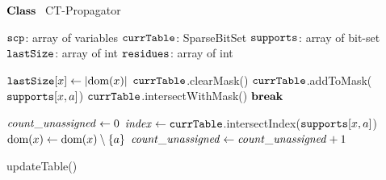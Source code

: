 \STATE $\textbf{Class~}$ CT-Propagator
    \item[]
      \STATE $\texttt{scp}$: array of variables
      \STATE $\texttt{currTable}$: SparseBitSet 
      \STATE $\texttt{supports}$: array of bit-set   
      \STATE $\texttt{lastSize}$: array of int 
      \STATE $\texttt{residues}$: array of int  
            
    \item[]
       \label{line:updateTable:1} 
       \label{line:updateTable:2} 
        \STATE $\texttt{lastSize}[x] \leftarrow |\text{dom}({x})|$ \label{line:updateTable:3} 
        \STATE $\texttt{currTable}$.clearMask() \label{line:updateTable:4} 
         \label{line:updateTable:5} 
          \STATE $\texttt{currTable}$.addToMask($\texttt{supports}[x,a]$) \label{line:updateTable:6} 
        \ENDFOREACH      
        \STATE $\texttt{currTable}$.intersectWithMask() \label{line:updateTable:7} 
         \label{line:updateTable:8} 
          \STATE $\textbf{break~}$  \label{line:updateTable:9} 
        \ENDIF
      \ENDFOREACH
      \Endfunc


    \item[]
       \label{line:filterDom:0}
      \STATE $\mathit{count\_unassigned} \leftarrow 0$ \label{line:filterDom:1}
       \label{line:filterDom:2}
             \label{line:filterDom:3}
                  \STATE $\mathit{index} \leftarrow \texttt{currTable}$.intersectIndex($\texttt{supports}[x,a]$) \label{line:filterDom:4}
                   \label{line:filterDom:5}
                        \STATE {}  \label{line:filterDom:6}
                  \ELSE
                        \STATE $\text{dom}({x}) \leftarrow \text{dom}({x}) \setminus \left\{a\right\}$ \label{line:filterDom:7}
                         \label{line:filterDom:8}
                           \STATE $\mathit{count\_unassigned} \leftarrow \mathit{count\_unassigned} + 1$\label{line:filterDom:9}
                        \ENDIF
                  \ENDIF
             \ENDFOREACH
      \ENDFOREACH
       \label{line:filterDom:10}
         \label{line:filterDom:11}
      \ELSE
         \label{line:filterDom:12}
      \ENDIF
      \Endfunc

    \item[]
         \label{line:propagate:1}
              \STATE updateTable() \label{line:propagate:2}
               \label{line:propagate:3}
                       \label{line:propagate:4}
              \ENDIF
               \label{line:propagate:5}
         \Endfunc

